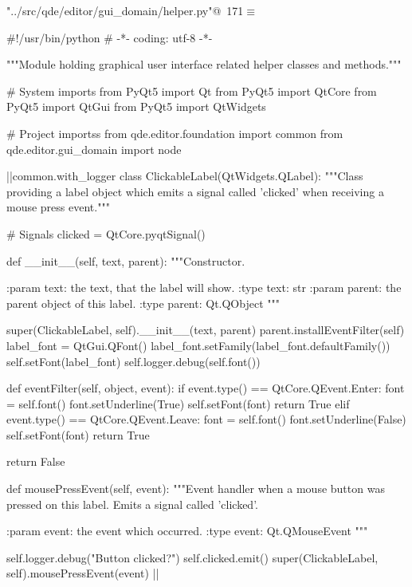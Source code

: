 \documentclass[%
    a4paper,    %
    justified,  %
    nobib,      %
    openany     %
]{tufte-book}
\begin{document}
\begin{flushleft} \small
\begin{minipage}{\linewidth}\label{scrap203}\raggedright\small
{} \verb@"../src/qde/editor/gui_domain/helper.py"@\nobreak\ {\footnotesize {171}}$\equiv$
\vspace{-1ex}
\begin{pythoncode}
#!/usr/bin/python
# -*- coding: utf-8 -*-

"""Module holding graphical user interface related helper classes and
methods."""

# System imports
from PyQt5 import Qt
from PyQt5 import QtCore
from PyQt5 import QtGui
from PyQt5 import QtWidgets

# Project importss
from qde.editor.foundation import common
from qde.editor.gui_domain import node


|\normalfont{}\fontfamily{}|common.with_logger
class ClickableLabel(QtWidgets.QLabel):
    """Class providing a label object which emits a signal called 'clicked'
    when receiving a mouse press event."""

    # Signals
    clicked = QtCore.pyqtSignal()

    def __init__(self, text, parent):
        """Constructor.

        :param text: the text, that the label will show.
        :type text: str
        :param parent: the parent object of this label.
        :type parent: Qt.QObject
        """

        super(ClickableLabel, self).__init__(text, parent)
        parent.installEventFilter(self)
        label_font = QtGui.QFont()
        label_font.setFamily(label_font.defaultFamily())
        self.setFont(label_font)
        self.logger.debug(self.font())

    def eventFilter(self, object, event):
        if event.type() == QtCore.QEvent.Enter:
            font = self.font()
            font.setUnderline(True)
            self.setFont(font)
            return True
        elif event.type() == QtCore.QEvent.Leave:
            font = self.font()
            font.setUnderline(False)
            self.setFont(font)
            return True

        return False

    def mousePressEvent(self, event):
        """Event handler when a mouse button was pressed on this label. Emits a
        signal called 'clicked'.

        :param event: the event which occurred.
        :type event: Qt.QMouseEvent
        """

        self.logger.debug("Button clicked?")
        self.clicked.emit()
        super(ClickableLabel, self).mousePressEvent(event)
|\NWsep|
\end{pythoncode}
\vspace{1.5ex}
\footnotesize
\begin{list}{}{\setlength{\itemsep}{-\parsep}\setlength{\itemindent}{-\leftmargin}}

\item{}
\end{list}
\end{minipage}\vspace{4ex}
\end{flushleft}
\end{document}
